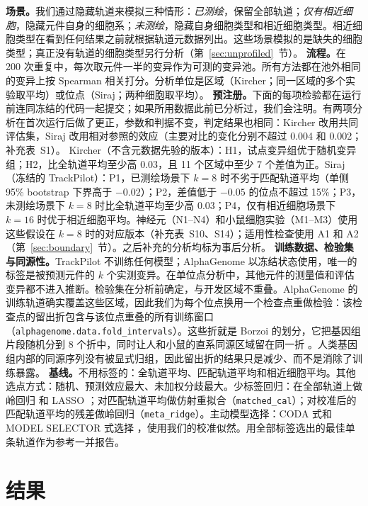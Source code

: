 \documentclass[webpdf,contemporary,large]{oup-authoring-template}
\newcommand{\tp}{TrackPilot}
\begin{document}
\textbf{场景。}我们通过隐藏轨道来模拟三种情形：\emph{已测绘}，保留全部轨道；\emph{仅有相近细胞}，隐藏元件自身的细胞系；\emph{未测绘}，隐藏自身细胞类型和相近细胞类型。相近细胞类型在看到任何结果之前就根据轨道元数据列出。这些场景模拟的是缺失的细胞类型；真正没有轨道的细胞类型另行分析（第~\ref{sec:unprofiled}~节）。
\textbf{流程。}在 200 次重复中，每次取元件一半的变异作为可测的变异池。所有方法都在池外相同的变异上按 Spearman 相关打分。分析单位是区域（Kircher；同一区域的多个实验取平均）或位点（Siraj；两种细胞取平均）。
\textbf{预注册。}下面的每项检验都在运行前连同冻结的代码一起提交；如果所用数据此前已分析过，我们会注明。有两项分析在首次运行后做了更正，参数和判据不变，判定结果也相同：Kircher 改用共同评估集，Siraj 改用相对参照的效应（主要对比的变化分别不超过 0.004 和 0.002；补充表~S1）。
Kircher（不含元数据先验的版本）：H1，试点变异组优于随机变异组；H2，比全轨道平均至少高 0.03，且 11 个区域中至少 7 个差值为正。Siraj（冻结的 \tp{}）：P1，已测绘场景下 $k=8$ 时不劣于匹配轨道平均（单侧 95\% bootstrap 下界高于 $-0.02$）；P2，差值低于 $-0.05$ 的位点不超过 15\%；P3，未测绘场景下 $k=8$ 时比全轨道平均至少高 0.03；P4，仅有相近细胞场景下 $k=16$ 时优于相近细胞平均。神经元（N1--N4）和小鼠细胞实验（M1--M3）使用这些假设在 $k=8$ 时的对应版本（补充表~S10、S14）；适用性检查使用 A1 和 A2（第~\ref{sec:boundary}~节）。之后补充的分析均标为事后分析。
\textbf{训练数据、检验集与同源性。}\tp{} 不训练任何模型；AlphaGenome 以冻结状态使用，唯一的标签是被预测元件的 $k$ 个实测变异。在单位点分析中，其他元件的测量值和评估变异都不进入推断。检验集在分析前确定，与开发区域不重叠。AlphaGenome 的训练轨道确实覆盖这些区域，因此我们为每个位点换用一个检查点重做检验：该检查点的留出折包含与该位点重叠的所有训练窗口（\texttt{alphagenome.data.fold\_intervals}）。这些折就是 Borzoi 的划分，它把基因组片段随机分到 8 个折中，同时让人和小鼠的直系同源区域留在同一折 \citep{linder2025borzoi}。人类基因组内部的同源序列没有被显式归组，因此留出折的结果只是减少、而不是消除了训练暴露。
\textbf{基线。}不用标签的：全轨道平均、匹配轨道平均和相近细胞平均。其他选点方式：随机、预测效应最大、未加权分歧最大。少标签回归：在全部轨道上做岭回归 \citep{hoerl1970ridge} 和 LASSO \citep{tibshirani1996lasso}；对匹配轨道平均做仿射重拟合（\texttt{matched\_cal}）；对校准后的匹配轨道平均的残差做岭回归（\texttt{meta\_ridge}）。主动模型选择：CODA 式和 MODEL SELECTOR 式选择 \citep{kay2025coda,okanovic2025modelselector}，使用我们的校准似然。用全部标签选出的最佳单条轨道作为参考一并报告。

\section{结果}
\end{document}
